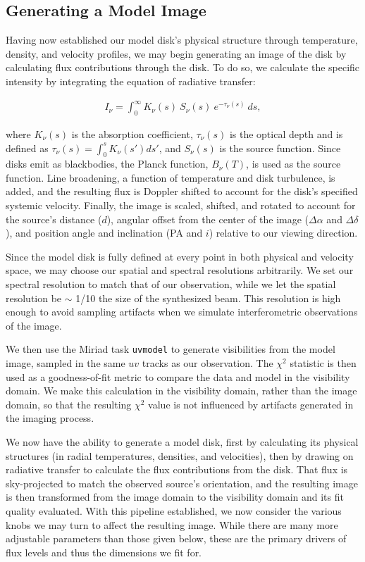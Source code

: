 \subsection{Generating a Model Image}

Having now established our model disk's physical structure through temperature, density, and velocity profiles, we may begin generating an image of the disk by calculating flux contributions through the disk. To do so, we calculate the specific intensity by integrating the equation of radiative transfer:

\begin{align}
  I_\nu = \int_0^{\infty} K_\nu(s)\ S_\nu(s)\ e^{-\tau_\nu(s)}\ ds,
\end{align}

where $K_\nu(s)$ is the absorption coefficient, $\tau_\nu(s)$ is the optical depth and is defined as $\tau_\nu(s) = \int_0^s K_\nu(s') ds'$, and $S_\nu(s)$ is the source function. Since disks emit as blackbodies, the Planck function, $B_\nu(T)$, is used as the source function. Line broadening, a function of temperature and disk turbulence, is added, and the resulting flux is Doppler shifted to account for the disk's specified systemic velocity. Finally, the image is scaled, shifted, and rotated to account for the source's distance ($d$), angular offset from the center of the image ($\Delta \alpha$ and $\Delta \delta$), and position angle and inclination (PA and $i$) relative to our viewing direction.


Since the model disk is fully defined at every point in both physical and velocity space, we may choose our spatial and spectral resolutions arbitrarily. We set our spectral resolution to match that of our observation, while we let the spatial resolution be $\sim$ 1/10 the size of the synthesized beam. This resolution is high enough to avoid sampling artifacts when we simulate interferometric observations of the image.

We then use the Miriad task \texttt{uvmodel} to generate visibilities from the model image, sampled in the same $uv$ tracks as our observation. The $\chi^2$ statistic is then used as a goodness-of-fit metric to compare the data and model in the visibility domain. We make this calculation in the visibility domain, rather than the image domain, so that the resulting $\chi^2$ value is not influenced by artifacts generated in the imaging process.



We now have the ability to generate a model disk, first by calculating its physical structures (in radial temperatures, densities, and velocities), then by drawing on radiative transfer to calculate the flux contributions from the disk. That flux is sky-projected to match the observed source's orientation, and the resulting image is then transformed from the image domain to the visibility domain and its fit quality evaluated. With this pipeline established, we now consider the various knobs we may turn to affect the resulting image. While there are many more adjustable parameters than those given below, these are the primary drivers of flux levels and thus the dimensions we fit for.

